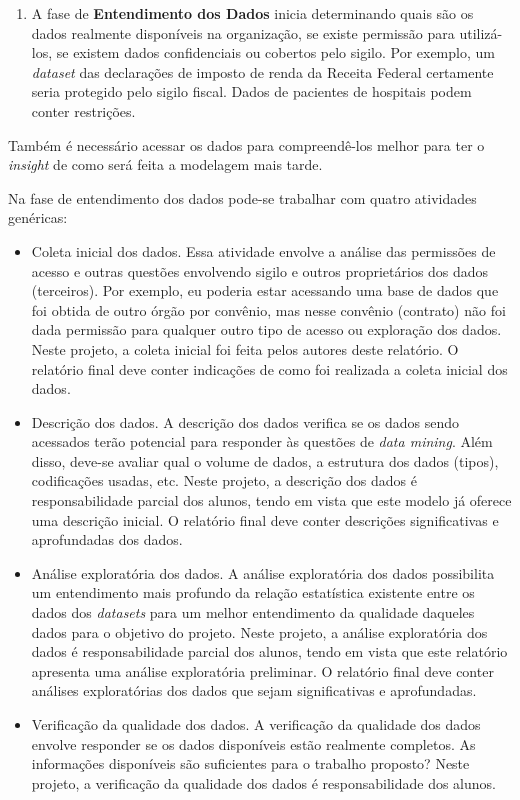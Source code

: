 \documentclass[]{article}
\providecommand{\tightlist}{%
  \setlength{\itemsep}{0pt}\setlength{\parskip}{0pt}}
\begin{document}
\begin{enumerate}
\def\labelenumi{\arabic{enumi}.}
\setcounter{enumi}{1}
\tightlist
\item
  A fase de \textbf{Entendimento dos Dados} inicia determinando quais
  são os dados realmente disponíveis na organização, se existe permissão
  para utilizá-los, se existem dados confidenciais ou cobertos pelo
  sigilo. Por exemplo, um \emph{dataset} das declarações de imposto de
  renda da Receita Federal certamente seria protegido pelo sigilo
  fiscal. Dados de pacientes de hospitais podem conter restrições.
\end{enumerate}

Também é necessário acessar os dados para compreendê-los melhor para ter
o \emph{insight} de como será feita a modelagem mais tarde.

Na fase de entendimento dos dados pode-se trabalhar com quatro
atividades genéricas:

\begin{itemize}
\item
  Coleta inicial dos dados. Essa atividade envolve a análise das
  permissões de acesso e outras questões envolvendo sigilo e outros
  proprietários dos dados (terceiros). Por exemplo, eu poderia estar
  acessando uma base de dados que foi obtida de outro órgão por
  convênio, mas nesse convênio (contrato) não foi dada permissão para
  qualquer outro tipo de acesso ou exploração dos dados. Neste projeto,
  a coleta inicial foi feita pelos autores deste relatório. O relatório
  final deve conter indicações de como foi realizada a coleta inicial
  dos dados.
\item
  Descrição dos dados. A descrição dos dados verifica se os dados sendo
  acessados terão potencial para responder às questões de \emph{data
  mining}. Além disso, deve-se avaliar qual o volume de dados, a
  estrutura dos dados (tipos), codificações usadas, etc. Neste projeto,
  a descrição dos dados é responsabilidade parcial dos alunos, tendo em
  vista que este modelo já oferece uma descrição inicial. O relatório
  final deve conter descrições significativas e aprofundadas dos dados.
\item
  Análise exploratória dos dados. A análise exploratória dos dados
  possibilita um entendimento mais profundo da relação estatística
  existente entre os dados dos \emph{datasets} para um melhor
  entendimento da qualidade daqueles dados para o objetivo do projeto.
  Neste projeto, a análise exploratória dos dados é responsabilidade
  parcial dos alunos, tendo em vista que este relatório apresenta uma
  análise exploratória preliminar. O relatório final deve conter
  análises exploratórias dos dados que sejam significativas e
  aprofundadas.
\item
  Verificação da qualidade dos dados. A verificação da qualidade dos
  dados envolve responder se os dados disponíveis estão realmente
  completos. As informações disponíveis são suficientes para o trabalho
  proposto? Neste projeto, a verificação da qualidade dos dados é
  responsabilidade dos alunos.
\end{itemize}
\end{document}
